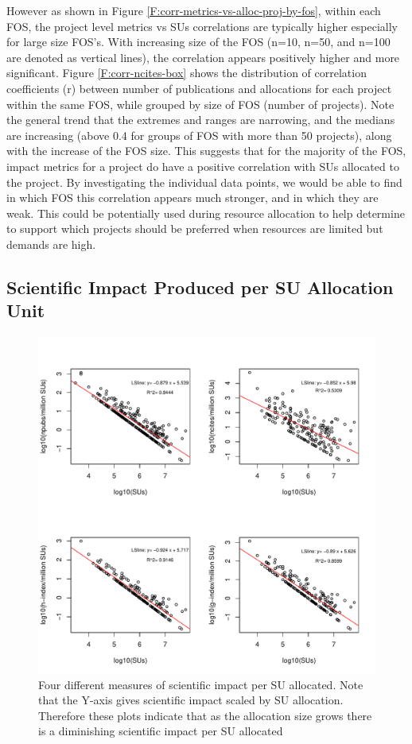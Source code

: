 \documentclass{sig-alternate}
\begin{document}
However as shown in Figure \ref{F:corr-metrics-vs-alloc-proj-by-fos},
within each FOS, the project level metrics vs SUs correlations are
typically higher especially for large size FOS's. With increasing size
of the FOS (n=10, n=50, and n=100 are denoted as vertical lines), the
correlation appears positively higher and more significant. Figure
\ref{F:corr-ncites-box} shows the distribution of correlation
coefficients (r) between number of publications and allocations for
each project within the same FOS, while grouped by size of FOS (number
of projects). Note the general trend that the extremes and ranges are
narrowing, and the medians are increasing (above 0.4 for groups of FOS
with more than 50 projects), along with the increase of the FOS
size. This suggests that for the majority of the FOS, impact metrics
for a project do have a positive correlation with SUs allocated to the
project. By investigating the individual data points, we would be able
to find in which FOS this correlation appears much stronger, and in
which they are weak. This could be potentially used during resource
allocation to help determine to support which projects should be
preferred when resources are limited but demands are high.

\subsection{Scientific Impact Produced per SU Allocation Unit} 

\begin{figure}[!htb] 
  \centering 
    \includegraphics[width=1.0\columnwidth]{images/09_roi_projs.pdf} 
  \caption{Four different measures of scientific impact per SU allocated.  Note that the Y-axis gives scientific impact scaled by SU allocation. Therefore these plots indicate that as the allocation size grows there is a diminishing scientific impact per SU allocated}\label{F:projs-roi} 
\end{figure} 
\end{document}
